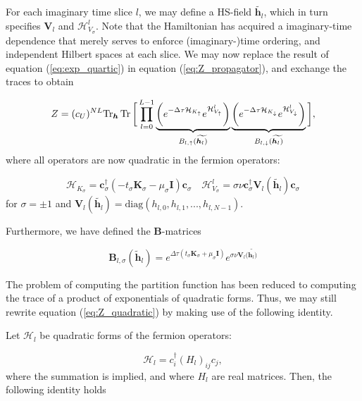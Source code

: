 For each imaginary time slice $l$, we may define a HS-field $\widetilde{\bm h_l}$, which in turn specifies $\bm V_l$ and $\mathcal{H}_{V_\sigma}^l$.
Note that the Hamiltonian has acquired a  imaginary-time dependence that merely serves to enforce (imaginary-)time ordering, and independent Hilbert spaces at each slice.
We may now replace the result of equation (\ref{eq:exp_quartic}) in equation (\ref{eq:Z_propagator}), and exchange the traces to obtain

\begin{equation}\label{eq:Z_quadratic}
Z  = (c_U)^{NL} \text{Tr}_{\bm h} \operatorname{Tr} \bigg[ \prod_{l=0}^{L-1} \underbrace{\bigg( e^{-\Delta\tau  \mathcal{H}_{K_\uparrow}} e^{\mathcal{H}_{V_\uparrow}^l} \bigg)}_{B_{l, \uparrow}(\widetilde{\bm h_l)}} \underbrace{\bigg( e^{-\Delta\tau  \mathcal{H}_{K_\downarrow}} e^{\mathcal{H}_{V_\downarrow}^l} \bigg)}_{B_{l, \downarrow}(\widetilde{\bm h_l)}} \bigg] ,
\end{equation}
where all operators are now quadratic in the fermion operators:

\begin{equation}
\mathcal{H}_{K_\sigma} = \bm c_\sigma^\dagger ( - t_\sigma \bm K_\sigma -\mu_\sigma \bm I ) \bm c_\sigma \quad \mathcal{H}_{V_\sigma}^l = \sigma \nu \bm c_\sigma^\dagger \bm V_l (\widetilde{\bm h_l}) \bm c_\sigma
\end{equation}
for $\sigma = \pm 1$ and $\bm V_l ( \widetilde{\bm h_l} ) = \text{diag} ( h_{l, 0} , h_{l, 1}, ... , h_{l, N-1} )$.

Furthermore, we have defined the $\bm B$-matrices

\begin{equation}
\bm B_{l, \sigma} ( \widetilde{\bm h}_l ) = e^{\Delta \tau ( t_\sigma \bm K_\sigma + \mu_\sigma \bm I)} e^{\sigma \nu \bm V_l (\widetilde{\bm h_l)}}
\end{equation}

The problem of computing the partition function has been reduced to computing the trace of a product of exponentials of quadratic forms.
Thus, we may still rewrite equation (\ref{eq:Z_quadratic}) by making use of the following identity.

Let $\mathcal{H}_l$ be quadratic forms of the fermion operators:

\begin{equation}
\mathcal{H}_l = c_i^\dagger (H_l)_{ij} c_j,
\end{equation}
where the summation is implied, and where $H_l$ are real matrices.
Then, the following identity holds

